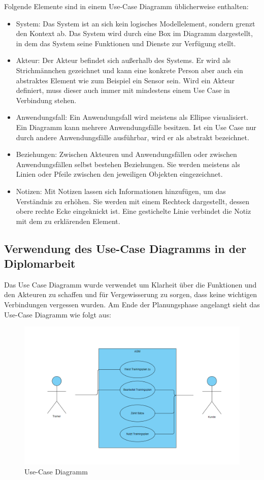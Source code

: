 Folgende Elemente sind in einem Use-Case Diagramm üblicherweise enthalten:
\begin{itemize}
    \item System: Das System ist an sich kein logisches Modellelement, sondern grenzt den Kontext ab. Das System wird durch eine Box im Diagramm dargestellt, in dem das System seine Funktionen und Dienste zur Verfügung stellt.
    \item Akteur: Der Akteur befindet sich außerhalb des Systems. Er wird als Strichmännchen gezeichnet und kann eine konkrete Person aber auch ein abstraktes Element wie zum Beispiel ein Sensor sein. Wird ein Akteur definiert, muss dieser auch immer mit mindestens einem Use Case in Verbindung stehen.
    \item Anwendungsfall: Ein Anwendungsfall wird meistens als Ellipse visualisiert. Ein Diagramm kann mehrere Anwendungsfälle besitzen. Ist ein Use Case nur durch andere Anwendungsfälle ausführbar, wird er als abstrakt bezeichnet.
    \item Beziehungen: Zwischen Akteuren und Anwendungsfällen oder zwischen Anwendungsfällen selbst bestehen Beziehungen. Sie werden meistens als Linien oder Pfeile zwischen den jeweiligen Objekten eingezeichnet.
    \item Notizen: Mit Notizen lassen sich Informationen hinzufügen, um das Verständnis zu erhöhen. Sie werden mit einem Rechteck dargestellt, dessen obere rechte Ecke eingeknickt ist. Eine gestichelte Linie verbindet die Notiz mit dem zu erklärenden Element.
    
    \end{itemize}
    \pagebreak
    \subsection{Verwendung des Use-Case Diagramms in der Diplomarbeit}

    Das Use Case Diagramm wurde verwendet um Klarheit über die Funktionen und den Akteuren zu schaffen und für Vergewisserung zu sorgen, dass keine wichtigen Verbindungen vergessen wurden.
    Am Ende der Planungsphase angelangt sieht das Use-Case Diagramm wie folgt aus:

    \begin{figure}[H]
        \centering
        \includegraphics[scale=0.6]{pics/Use Case Diagramm.png}
        \caption{Use-Case Diagramm}
    \end{figure}


